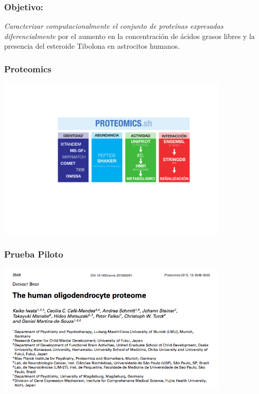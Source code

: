 \documentclass[10pt]{beamer}
\begin{document}
\begin{frame}
\frametitle{Objetivo:}
\begin{center}
\emph{Caracterizar computacionalmente el conjunto de proteínas expresadas diferencialmente} por el aumento en la concentración de ácidos grasos libres y la presencia del esteroide Tibolona en astrocitos humanos.
\end{center}
\end{frame}
\begin{frame}
\frametitle{Proteomics}
\begin{center}
\includegraphics[width=11cm]{imagenes/PUJ-Proteomics}
\end{center}
\end{frame}
\begin{frame}
\frametitle{Prueba Piloto}
\begin{center}
\includegraphics[width=11cm]{imagenes/OL}
\end{center}
\end{frame}
\end{document}
